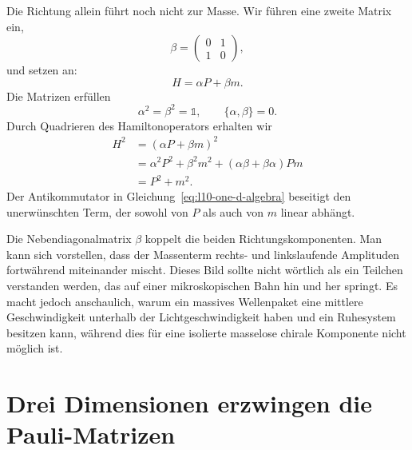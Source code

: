 Die Richtung allein führt noch nicht zur Masse. Wir führen eine zweite Matrix ein,
\begin{equation}
\beta=
\begin{pmatrix}
0&1\\
1&0
\end{pmatrix},
\end{equation}
und setzen an:
\begin{equation}
H=\alpha P+\beta m.
\label{eq:l10-massive-one-d}
\end{equation}
Die Matrizen erfüllen
\begin{equation}
\alpha^2=\beta^2=\mathbb{1},
\qquad
\{\alpha,\beta\}=0.
\label{eq:l10-one-d-algebra}
\end{equation}
Durch Quadrieren des Hamiltonoperators erhalten wir
\begin{align}
H^2
&=(\alpha P+\beta m)^2\\
&=\alpha^2P^2+\beta^2m^2
  +(\alpha\beta+\beta\alpha)Pm\\
&=P^2+m^2.
\label{eq:l10-one-d-dispersion}
\end{align}
Der Antikommutator in Gleichung~\eqref{eq:l10-one-d-algebra} beseitigt den unerwünschten Term, der sowohl von \(P\) als auch von \(m\) linear abhängt.

Die Nebendiagonalmatrix \(\beta\) koppelt die beiden Richtungskomponenten. Man kann sich vorstellen, dass der Massenterm rechts- und linkslaufende Amplituden fortwährend miteinander mischt. Dieses Bild sollte nicht wörtlich als ein Teilchen verstanden werden, das auf einer mikroskopischen Bahn hin und her springt. Es macht jedoch anschaulich, warum ein massives Wellenpaket eine mittlere Geschwindigkeit unterhalb der Lichtgeschwindigkeit haben und ein Ruhesystem besitzen kann, während dies für eine isolierte masselose chirale Komponente nicht möglich ist.

\begin{classroomqa}
\end{classroomqa}

\section{Drei Dimensionen erzwingen die Pauli-Matrizen}

